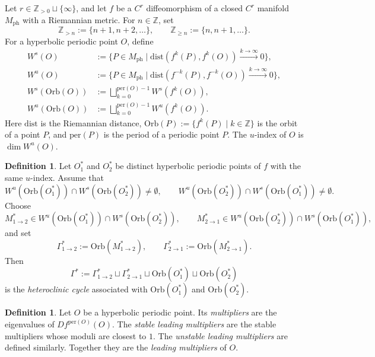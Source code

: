 \documentclass[11pt,a4paper]{article}
\theoremstyle{plain}
\theoremstyle{definition}
\newtheorem{definition}[theorem]{Definition}
\theoremstyle{plain}
\numberwithin{equation}{section}
\begin{document}
Let $r \in \mathbb{Z}_{>0} \sqcup \{\infty\}$, and let $f$ be a $C^r$ diffeomorphism of a closed $C^r$ manifold $M_\mathrm{ph}$ with a Riemannian metric. For $n \in \mathbb{Z}$, set
\[
\mathbb{Z}_{> n} := \{n + 1, n + 2, \dots\},
\qquad
\mathbb{Z}_{\ge n} := \{n, n + 1, \dots\}.
\]
For a hyperbolic periodic point $O$, define
\begin{align*}
W^s(O) &:= \{P \in M_\mathrm{ph} \mid \mathrm{dist}(f^k(P), f^k(O)) \xrightarrow{k \to \infty} 0\}, \\
W^u(O) &:= \{P \in M_\mathrm{ph} \mid \mathrm{dist}(f^{-k}(P), f^{-k}(O)) \xrightarrow{k \to \infty} 0\}, \\
W^s(\mathrm{Orb}(O)) &:= \bigsqcup_{k = 0}^{\mathrm{per}(O) - 1} W^s(f^k(O)), \\
W^u(\mathrm{Orb}(O)) &:= \bigsqcup_{k = 0}^{\mathrm{per}(O) - 1} W^u(f^k(O)).
\end{align*}
Here $\mathrm{dist}$ is the Riemannian distance, $\mathrm{Orb}(P) := \{f^k(P) \mid k \in \mathbb{Z}\}$ is the orbit of a point $P$, and $\mathrm{per}(P)$ is the period of a periodic point $P$. The $u$-index of $O$ is $\dim W^u(O)$.

\begin{definition}
Let $O_1^*$ and $O_2^*$ be distinct hyperbolic periodic points of $f$ with the same $u$-index. Assume that
\[
W^u(\mathrm{Orb}(O_1^*)) \cap W^s(\mathrm{Orb}(O_2^*)) \neq \emptyset,
\qquad
W^u(\mathrm{Orb}(O_2^*)) \cap W^s(\mathrm{Orb}(O_1^*)) \neq \emptyset.
\]
Choose
\[
M_{1 \to 2}^* \in W^u(\mathrm{Orb}(O_1^*)) \cap W^s(\mathrm{Orb}(O_2^*)),
\qquad
M_{2 \to 1}^* \in W^u(\mathrm{Orb}(O_2^*)) \cap W^s(\mathrm{Orb}(O_1^*)),
\]
and set
\[
\Gamma_{1 \to 2}^* := \mathrm{Orb}(M_{1 \to 2}^*),
\qquad
\Gamma_{2 \to 1}^* := \mathrm{Orb}(M_{2 \to 1}^*).
\]
Then
\[
\Gamma^* := \Gamma_{1 \to 2}^* \sqcup \Gamma_{2 \to 1}^* \sqcup \mathrm{Orb}(O_1^*) \sqcup \mathrm{Orb}(O_2^*)
\]
is the \emph{heteroclinic cycle} associated with $\mathrm{Orb}(O_1^*)$ and $\mathrm{Orb}(O_2^*)$.
\end{definition}

\begin{definition}
Let $O$ be a hyperbolic periodic point. Its \emph{multipliers} are the eigenvalues of $Df^{\mathrm{per}(O)}(O)$. The \emph{stable leading multipliers} are the stable multipliers whose moduli are closest to $1$. The \emph{unstable leading multipliers} are defined similarly. Together they are the \emph{leading multipliers} of $O$.
\end{definition}
\end{document}
